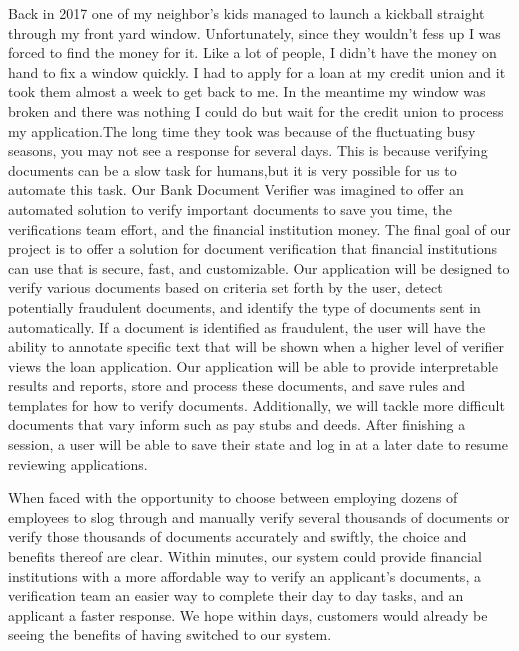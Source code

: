 Back in 2017 one of my neighbor’s kids managed to launch a kickball straight through my front yard window. Unfortunately, since they wouldn’t fess up I was forced to find the money for it. Like a lot of people, I didn’t have the money on hand to fix a window quickly. I had to apply for a loan at my credit union and it took them almost a week to get back to me. In the meantime my window was broken and there was nothing I could do but wait for the credit union to process my application.The long time they took was because of the fluctuating busy seasons, you may not see a response for several days. This is because verifying documents can be a slow task for humans,but it is very possible for us to automate this task. Our Bank Document Verifier was imagined to offer an automated solution to verify important documents to save you time, the verifications team effort, and the financial institution money. The final goal of our project is to offer a solution for document verification that financial institutions can use that is secure, fast, and customizable. Our application will be designed to verify various documents based on criteria set forth by the user, detect potentially fraudulent documents, and identify the type of documents sent in automatically. If a document is identified as fraudulent, the user will have the ability to annotate specific text that will be shown when a higher level of verifier views the loan application. Our application will be able to provide interpretable results and reports, store and process these documents, and save rules and templates for how to verify documents. Additionally, we will tackle more difficult documents that vary inform such as pay stubs and deeds. After finishing a session, a user will be able to save their state and log in at a later date to resume reviewing applications.

When faced with the opportunity to choose between employing dozens of employees to slog through and manually verify several thousands of documents or verify those thousands of documents accurately and swiftly, the choice and benefits thereof are clear. Within minutes, our system could provide financial institutions with a more affordable way to verify an applicant’s documents, a verification team an easier way to complete their day to day tasks, and an applicant a faster response. We hope within days, customers would already be seeing the benefits of having switched to our system.